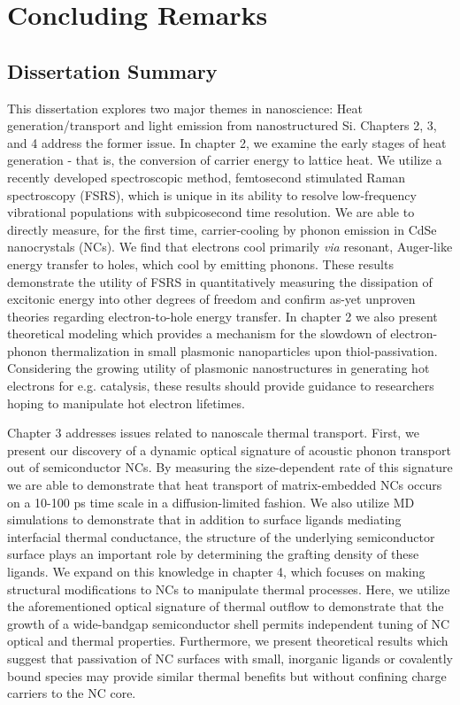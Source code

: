 \chapter{Concluding Remarks}

\section{Dissertation Summary}

This dissertation explores two major themes in nanoscience: Heat generation/transport and light emission from nanostructured Si. Chapters 2, 3, and 4 address the former issue. In chapter 2, we examine the early stages of heat generation - that is, the conversion of carrier energy to lattice heat. We utilize a recently developed spectroscopic method, femtosecond stimulated Raman spectroscopy (FSRS), which is unique in its ability to resolve low-frequency vibrational populations with subpicosecond time resolution. We are able to directly measure, for the first time, carrier-cooling by phonon emission in CdSe nanocrystals (NCs). We find that electrons cool primarily \emph{via} resonant, Auger-like energy transfer to holes, which cool by emitting phonons. These results demonstrate the utility of FSRS in quantitatively measuring the dissipation of excitonic energy into other degrees of freedom and confirm as-yet unproven theories regarding electron-to-hole energy transfer. In chapter 2 we also present theoretical modeling which provides a mechanism for the slowdown of electron-phonon thermalization in small plasmonic nanoparticles upon thiol-passivation. Considering the growing utility of plasmonic nanostructures in generating hot electrons for e.g. catalysis, these results should provide guidance to researchers hoping to manipulate hot electron lifetimes. \par
Chapter 3 addresses issues related to nanoscale thermal transport. First, we present our discovery of a dynamic optical signature of acoustic phonon transport out of semiconductor NCs. By measuring the size-dependent rate of this signature we are able to demonstrate that heat transport of matrix-embedded NCs occurs on a 10-100 ps time scale in a diffusion-limited fashion. We also utilize MD simulations to demonstrate that in addition to surface ligands mediating interfacial thermal conductance, the structure of the underlying semiconductor surface plays an important role by determining the grafting density of these ligands. We expand on this knowledge in chapter 4, which focuses on making structural modifications to NCs to manipulate thermal processes. Here, we utilize the aforementioned optical signature of thermal outflow to demonstrate that the growth of a wide-bandgap semiconductor shell permits independent tuning of NC optical and thermal properties. Furthermore, we present theoretical results which suggest that passivation of NC surfaces with small, inorganic ligands or covalently bound species may provide similar thermal benefits but without confining charge carriers to the NC core. \par
